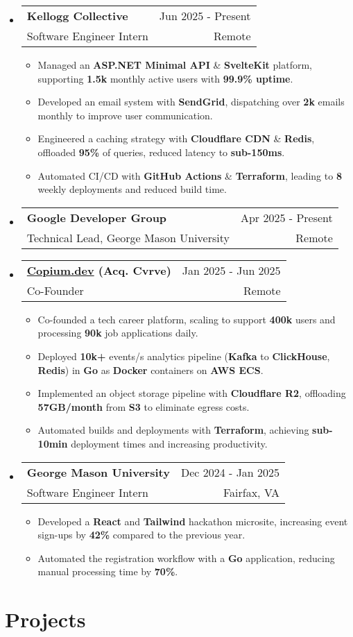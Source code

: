 \documentclass[letterpaper,11pt]{article}
\makeatletter
\newcommand{\resumeItem}[1]{
  \item{
    {#1}
  }
}
\newcommand{\resumeSubheading}[4]{
    \item
    \begin{tabular*}{0.985\textwidth}[t]{l@{\extracolsep{\fill}}r@{\hspace{-0.1in}}}
        {\textbf{#1}} & {#2} \\
        #3 &  #4 \\
    \end{tabular*}\vspace{-5pt}
}
\newcommand{\resumeSubHeadingListStart}{\begin{itemize}[leftmargin=0.00in, rightmargin=-0.2in, label={}]\vspace{3pt}}
\newcommand{\resumeSubHeadingListEnd}{\end{itemize}\vspace{-5pt}}
\newcommand{\resumeItemListStart}{\vspace{3pt}\begin{itemize}[leftmargin=0.15in, rightmargin=0.15in]}
\newcommand{\resumeItemListEnd}{\end{itemize}\vspace{-5pt}}
\makeatother
\begin{document}
\resumeSubHeadingListStart
\resumeSubheading
{Kellogg Collective} {Jun 2025 - Present}
{Software Engineer Intern} {Remote}
\resumeItemListStart
\resumeItem{Managed an \textbf{ASP.NET Minimal API} \& \textbf{SvelteKit} platform, supporting \textbf{1.5k} monthly active users with \textbf{99.9\% uptime}.}
\resumeItem{Developed an email system with \textbf{SendGrid}, dispatching over \textbf{2k} emails monthly to improve user communication.}
\resumeItem{Engineered a caching strategy with \textbf{Cloudflare CDN} \& \textbf{Redis}, offloaded \textbf{95\%} of queries, reduced latency to \textbf{sub-150ms}.}
\resumeItem{Automated CI/CD with \textbf{GitHub Actions} \& \textbf{Terraform}, leading to \textbf{8} weekly deployments and reduced build time.}
\resumeItemListEnd
\resumeSubHeadingListEnd

\resumeSubHeadingListStart
\resumeSubheading
{Google Developer Group} {Apr 2025 - Present}
{Technical Lead, George Mason University} {Remote}
\resumeSubHeadingListEnd

\resumeSubHeadingListStart
\resumeSubheading
{\href{https://www.copium.dev}{Copium.dev} (Acq. Cvrve)} {Jan 2025 - Jun 2025}
{Co-Founder} {Remote}
\resumeItemListStart
\resumeItem{Co-founded a tech career platform, scaling to support \textbf{400k} users and processing \textbf{90k} job applications daily.}
\resumeItem{Deployed \textbf{10k+} events/s analytics pipeline (\textbf{Kafka} to \textbf{ClickHouse}, \textbf{Redis}) in \textbf{Go} as \textbf{Docker} containers on \textbf{AWS ECS}.}
\resumeItem{Implemented an object storage pipeline with \textbf{Cloudflare R2}, offloading \textbf{57GB/month} from \textbf{S3} to eliminate egress costs.}
\resumeItem{Automated builds and deployments with \textbf{Terraform}, achieving \textbf{sub-10min} deployment times and increasing productivity.}
\resumeItemListEnd
\resumeSubHeadingListEnd

\resumeSubHeadingListStart
\resumeSubheading
{George Mason University} {Dec 2024 - Jan 2025}
{Software Engineer Intern} {Fairfax, VA}
\resumeItemListStart
\resumeItem{Developed a \textbf{React} and \textbf{Tailwind} hackathon microsite, increasing event sign-ups by \textbf{42\%} compared to the previous year.}
\resumeItem{Automated the registration workflow with a \textbf{Go} application, reducing manual processing time by \textbf{70\%}.}
\resumeItemListEnd
\resumeSubHeadingListEnd


\section{Projects}
\end{document}
